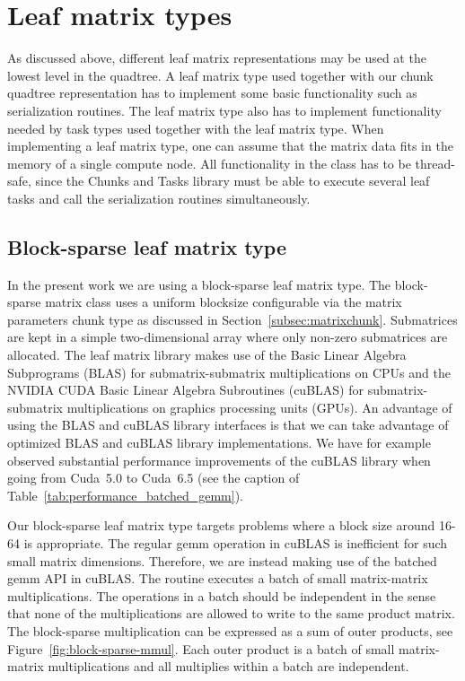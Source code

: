 \documentclass{elsarticle}
\begin{document}
\section{Leaf matrix types}\label{sec:leaf_matrix_types}
 As discussed above, different leaf matrix representations may be used
 at the lowest level in the quadtree. 
A leaf matrix type used together with our chunk quadtree
representation has to implement some basic functionality such as
serialization routines. The leaf matrix type also has to implement
functionality needed by task types used together with the leaf matrix
type. When implementing a leaf matrix type, one can assume that the
matrix data fits in the memory of a single compute node. All
functionality in the class has to be thread-safe, since the Chunks and
Tasks library must be able to execute several leaf tasks and call the
serialization routines simultaneously.



\subsection{Block-sparse leaf matrix type}\label{subsec:blocksparse}

In the present work we are using a block-sparse leaf matrix type.
The block-sparse matrix class uses a uniform blocksize configurable
via the matrix parameters chunk type as discussed in
Section~\ref{subsec:matrixchunk}.
Submatrices are kept in a simple two-dimensional array where only
non-zero submatrices are allocated.
The
leaf matrix library makes use of the Basic Linear Algebra Subprograms
(BLAS) \cite{blas-level3} for submatrix-submatrix multiplications on CPUs
and the NVIDIA CUDA Basic Linear Algebra Subroutines (cuBLAS)
\cite{cublas} for submatrix-submatrix multiplications on 
graphics processing units (GPUs).
An
advantage of using the BLAS and cuBLAS library interfaces is that we
can take advantage of optimized BLAS and cuBLAS
library implementations.  We have for example observed substantial
performance improvements of the cuBLAS library when going from
Cuda~5.0 to Cuda~6.5 (see the caption of Table~\ref{tab:performance_batched_gemm}).








Our block-sparse leaf matrix type targets problems where a block size
around 16-64 is appropriate. The regular gemm operation in cuBLAS is
inefficient for such small matrix dimensions. Therefore, we are
instead making use of the batched gemm API in cuBLAS. The routine
executes a batch of small matrix-matrix multiplications. The
operations in a batch should be independent in the sense that none of
the multiplications are allowed to write to the same product matrix.
The block-sparse multiplication can be expressed as a sum of outer
products, see Figure~\ref{fig:block-sparse-mmul}. Each outer product is
a batch of small matrix-matrix multiplications and all multiplies
within a batch are independent.
\end{document}
